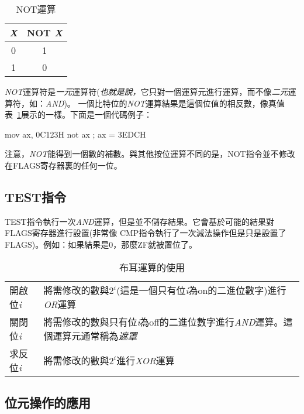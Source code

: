 \begin{table}[t]
\centering
\begin{tabular}{|c|c|}
\hline
\emph{X} & NOT \emph{X} \\
\hline \hline
0 & 1 \\
1 & 0 \\
\hline
\end{tabular}
\caption{NOT運算 \label{tab:not}}
\end{table}

\emph{NOT}運算符是\emph{一元}運算符(\emph{也就是說，}它只對一個運算元進行運算，而不像\emph{二元}運算符，如：\emph{AND})。
一個比特位的\emph{NOT}運算結果是這個位值的相反數，像真值表~\ref{tab:not}展示的一樣。下面是一個代碼例子：

\begin{AsmCodeListing}[frame=none]
      mov    ax, 0C123H
      not    ax                 ; ax = 3EDCH
\end{AsmCodeListing}

注意，\emph{NOT}能得到一個數的補數。與其他按位運算不同的是，{\code NOT}指令並不修改在{\code FLAGS}寄存器裏的任何一位。

\subsection{{\code TEST}指令 }

{\code
TEST}指令執行一次\emph{AND}運算，但是並不儲存結果。它會基於可能的結果對{\code
FLAGS}寄存器進行設置(非常像{\code
CMP}指令執行了一次減法操作但是只是設置了{\code
FLAGS})。例如：如果結果是0，那麼{\code ZF}就被置位了。

\begin{table}
\begin{tabular}{lp{3in}}
開啟位\emph{i} & 將需修改的數與$2^i$(這是一個只有位\emph{i}為on的二進位數字)進行\emph{OR}運算 \\
關閉位\emph{i} &
將需修改的數與只有位\emph{i}為off的二進位數字進行\emph{AND}運算。這個運算元通常稱為\emph{遮罩} \\
求反位\emph{i} & 將需修改的數與$2^i$進行\emph{XOR}運算
\end{tabular}
\caption{布耳運算的使用  \label{tab:bool}}
\end{table}

\subsection{位元操作的應用}

